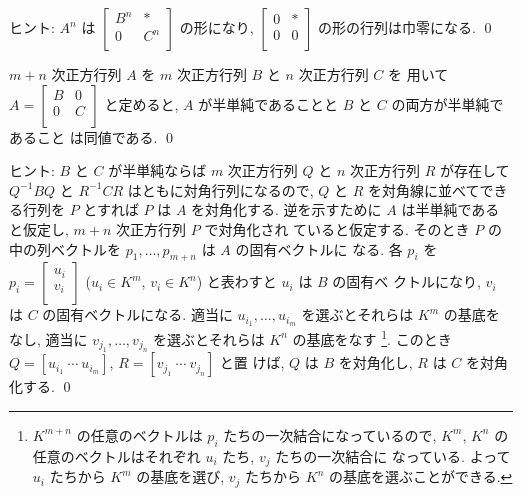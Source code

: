 \documentclass[12pt,twoside]{jarticle}
\begin{document}
\noindent
ヒント: $A^n$ は $
\begin{bmatrix}
  B^n & *   \\
    0 & C^n \\
\end{bmatrix}$ の形になり, $
\begin{bmatrix}
  0 & * \\
  0 & 0 \\
\end{bmatrix}$ の形の行列は巾零になる.
\qed


\begin{question}
\label{q:semisimple:[B,0;0,C]}
  $m+n$ 次正方行列 $A$ を $m$ 次正方行列 $B$ と $n$ 次正方行列 $C$ を
  用いて $
    A =
    \begin{bmatrix}
      B & 0 \\
      0 & C \\
    \end{bmatrix}
  $ と定めると, $A$ が半単純であることと $B$ と $C$ の両方が半単純であること
  は同値である. 
  \qed
\end{question}

\noindent
ヒント: $B$ と $C$ が半単純ならば $m$ 次正方行列 $Q$ と $n$ 次正方行列 $R$ 
が存在して $Q^{-1}BQ$ と $R^{-1}CR$ はともに対角行列になるので, $Q$ と $R$ 
を対角線に並べてできる行列を $P$ とすれば $P$ は $A$ を対角化する.  
逆を示すために $A$ は半単純であると仮定し, $m+n$ 次正方行列 $P$ で対角化され
ていると仮定する. 
そのとき $P$ の中の列ベクトルを $p_1,\dots,p_{m+n}$ は $A$ の固有ベクトルに
なる.  各 $p_i$ を $p_i = 
\begin{bmatrix}
  u_i \\
  v_i \\
\end{bmatrix}$ ($u_i\in K^m$, $v_i\in K^n$) と表わすと $u_i$ は $B$ の固有ベ
クトルになり, $v_i$ は $C$ の固有ベクトルになる. 
適当に $u_{i_1},\dots,u_{i_m}$ を選ぶとそれらは $K^m$ の基底をなし,
適当に $v_{j_1},\dots,v_{j_n}$ を選ぶとそれらは $K^n$ の基底をなす%
\footnote{$K^{m+n}$ の任意のベクトルは $p_i$ たちの一次結合になっているので,
  $K^m$, $K^n$ の任意のベクトルはそれぞれ $u_i$ たち, $v_j$ たちの一次結合に
  なっている.  よって $u_i$ たちから $K^m$ の基底を選び, 
  $v_j$ たちから $K^n$ の基底を選ぶことができる.}.
このとき $Q=[u_{i_1}\ \cdots\ u_{i_m}]$, $R=[v_{j_1}\ \cdots\ v_{j_n}]$ と置
けば,  $Q$ は $B$ を対角化し, $R$ は $C$ を対角化する. 
\qed

\end{document}
